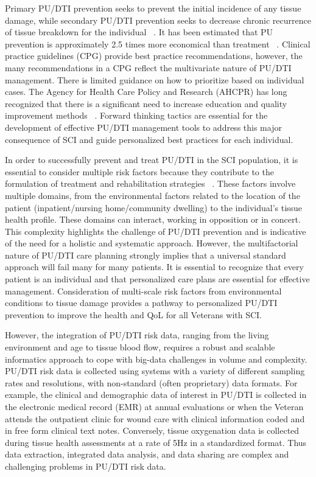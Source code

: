 \documentclass{amia}
\begin{document}
Primary PU/DTI prevention seeks to prevent the initial incidence of any tissue damage, while secondary PU/DTI prevention seeks to decrease chronic recurrence of tissue breakdown for the individual ~\cite{ref7}. It has been estimated that PU prevention is approximately 2.5 times more economical than treatment ~\cite{ref8}. Clinical practice guidelines (CPG) provide best practice recommendations, however, the many recommendations in a CPG reflect the multivariate nature of PU/DTI management. There is limited guidance on how to prioritize based on individual cases. The Agency for Health Care Policy and Research (AHCPR) has long recognized that there is a significant need to increase education and quality improvement methods ~\cite{ref9}. Forward thinking tactics are essential for the development of effective PU/DTI management tools to address this major consequence of SCI and guide personalized best practices for each individual.

In order to successfully prevent and treat PU/DTI in the SCI population, it is essential to consider multiple risk factors because they contribute to the formulation of treatment and rehabilitation strategies ~\cite{ref10}. These factors involve multiple domains, from the environmental factors related to the location of the patient (inpatient/nursing home/community dwelling) to the individual’s tissue health profile. These domains can interact, working in opposition or in concert. This complexity highlights the challenge of PU/DTI prevention and is indicative of the need for a holistic and systematic approach. However, the multifactorial nature of PU/DTI care planning strongly implies that a universal standard approach will fail many for many patients. It is essential to recognize that every patient is an individual and that personalized care plans are essential for effective management. Consideration of multi-scale risk factors from environmental conditions to tissue damage provides a pathway to personalized PU/DTI prevention to improve the health and QoL for all Veterans with SCI.

However, the integration of PU/DTI risk data, ranging from the living environment and age to tissue blood flow, requires a robust and scalable informatics approach to cope with big-data challenges in volume and complexity. PU/DTI risk data is collected using systems with a variety of different sampling rates and resolutions, with non-standard (often proprietary) data formats. For example, the clinical and demographic data of interest in PU/DTI is collected in the electronic medical record (EMR) at annual evaluations or when the Veteran attends the outpatient clinic for wound care with clinical information coded and in free form clinical text notes. Conversely, tissue oxygenation data is collected during tissue health assessments at a rate of 5Hz in a standardized format. Thus data extraction, integrated data analysis, and data sharing are complex and challenging problems in PU/DTI risk data.
\end{document}
